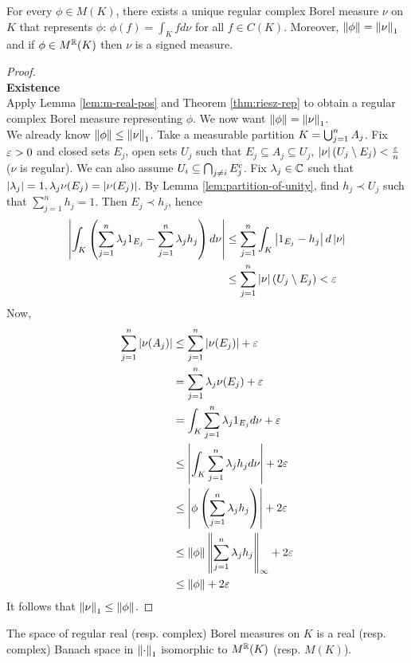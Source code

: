 \documentclass{article}
\begin{document}
\begin{cor}
  For every $\phi \in M(K)$, there exists a unique regular complex Borel measure $\nu$ on $K$ that represents $\phi$: $\phi(f) = \int_K f d\nu$ for all $f \in C(K)$. Moreover, $\left\lVert \phi\right\rVert = \left\lVert \nu\right\rVert_1$ and if $\phi \in M^\mathbb R(K)$ then $\nu$ is a signed measure.
\end{cor}
\begin{proof}~\\
  {\bf Existence} \\
  Apply Lemma \ref{lem:m-real-pos} and Theorem \ref{thm:riesz-rep} to obtain a regular complex Borel measure representing $\phi$. We now want $\left\lVert \phi\right\rVert = \left\lVert \nu\right\rVert_1$. \\
  We already know $\left\lVert \phi\right\rVert \le \left\lVert \nu\right\rVert_1$. Take a measurable partition $K = \bigcup_{j = 1}^n A_j$. Fix $\varepsilon > 0$ and closed sets $E_j$, open sets $U_j$ such that $E_j \subseteq A_j \subseteq U_j$, $\left\lvert \nu\right\rvert(U_j \setminus E_j) < \frac{\varepsilon} n$ ($\nu$ is regular). We can also assume $U_i \subseteq \bigcap_{j \ne i} E_j^c$. Fix $\lambda_j \in \mathbb C$ such that $\left\lvert \lambda_j\right\rvert = 1, \lambda_j\nu(E_j) = \left\lvert \nu(E_j)\right\rvert$. By Lemma \ref{lem:partition-of-unity}, find $h_j \prec U_j$ such that $\sum_{j = 1}^n h_j = 1$. Then $E_j \prec h_j$, hence
  \begin{align*}
    \left\lvert \int_K \left(\sum_{j = 1}^n \lambda_j 1_{E_j} - \sum_{j = 1}^n \lambda_jh_j\right) d\nu\right\rvert
    & \le \sum_{j = 1}^n \int_K \left\lvert 1_{E_j} - h_j\right\rvert d\left\lvert \nu\right\rvert \\
    & \le \sum_{j = 1}^n \left\lvert \nu\right\rvert(U_j \setminus E_j) < \varepsilon
  \end{align*}
  Now,
  \begin{align*}
    \sum_{j = 1}^n \left\lvert \nu(A_j)\right\rvert
    & \le \sum_{j = 1}^n \left\lvert \nu(E_j)\right\rvert + \varepsilon \\
    & = \sum_{j = 1}^n \lambda_j\nu(E_j) + \varepsilon \\
    & = \int_K \sum_{j = 1}^n \lambda_j1_{E_j} d\nu + \varepsilon \\
    & \le \left\lvert \int_K \sum_{j = 1}^n \lambda_jh_j d\nu\right\rvert + 2\varepsilon \\
    & \le \left\lvert \phi\left(\sum_{j = 1}^n \lambda_jh_j\right)\right\rvert + 2\varepsilon \\
    & \le \left\lVert \phi\right\rVert \left\lVert \sum_{j = 1}^n \lambda_jh_j\right\rVert_\infty + 2\varepsilon \\
    & \le \left\lVert \phi\right\rVert + 2\varepsilon
  \end{align*}
  It follows that $\left\lVert \nu\right\rVert_1 \le \left\lVert \phi\right\rVert$.
\end{proof}

\begin{cor}
  The space of regular real (resp. complex) Borel measures on $K$ is a real (resp. complex) Banach space in $\left\lVert \cdot\right\rVert_1$ isomorphic to $M^\mathbb R(K)$ (resp. $M(K)$).
\end{cor}
\end{document}
